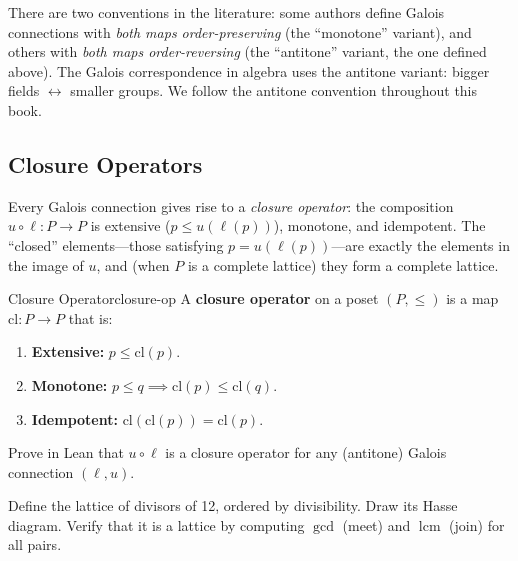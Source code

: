 \documentclass[11pt, a4paper, oneside]{book}
\newcommand{\lcm}{\operatorname{lcm}}
\newcounter{exercise}[chapter]
\begin{document}
\begin{warning}
There are two conventions in the literature: some authors define Galois
connections with \emph{both maps order-preserving} (the ``monotone'' variant),
and others with \emph{both maps order-reversing} (the ``antitone'' variant, the
one defined above). The Galois correspondence in algebra uses the antitone
variant: bigger fields $\leftrightarrow$ smaller groups. We follow the antitone
convention throughout this book.
\end{warning}

\subsection{Closure Operators}

Every Galois connection gives rise to a \emph{closure operator}: the
composition $u \circ \ell : P \to P$ is extensive ($p \leq u(\ell(p))$),
monotone, and idempotent. The ``closed'' elements---those satisfying
$p = u(\ell(p))$---are exactly the elements in the image of $u$, and
(when $P$ is a complete lattice) they form a complete lattice.

\begin{defn}{Closure Operator}{closure-op}
A \textbf{closure operator} on a poset $(P, \leq)$ is a map
$\mathrm{cl} : P \to P$ that is:
\begin{enumerate}[nosep, label=(\roman*)]
\item \textbf{Extensive:} $p \leq \mathrm{cl}(p)$.
\item \textbf{Monotone:} $p \leq q \implies \mathrm{cl}(p) \leq \mathrm{cl}(q)$.
\item \textbf{Idempotent:} $\mathrm{cl}(\mathrm{cl}(p)) = \mathrm{cl}(p)$.
\end{enumerate}
\end{defn}

\begin{exercisebox}[title={Exercise 3.1}]
Prove in Lean that $u \circ \ell$ is a closure operator for any (antitone)
Galois connection $(\ell, u)$.
\end{exercisebox}

\begin{exercisebox}[title={Exercise 3.2}]
Define the lattice of divisors of 12, ordered by divisibility. Draw its Hasse
diagram. Verify that it is a lattice by computing $\gcd$ (meet) and $\lcm$
(join) for all pairs.
\end{exercisebox}
\end{document}
